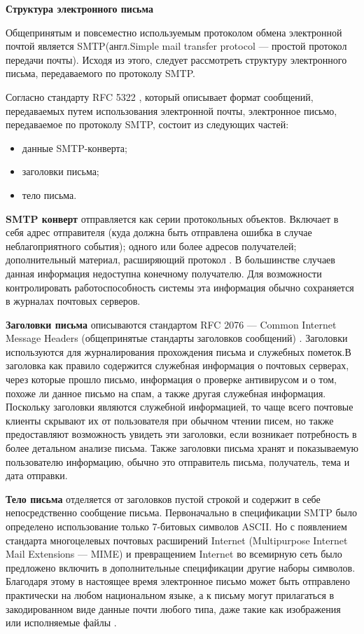 \textbf{Структура электронного письма}

Общепринятым и повсеместно используемым протоколом обмена электронной почтой является SMTP(англ.Simple mail transfer protocol — простой протокол передачи почты). Исходя из этого, следует рассмотреть структуру электронного письма, передаваемого по протоколу SMTP.

Согласно стандарту RFC 5322 \cite{rfc5322}, который описывает формат сообщений, передаваемых путем использования электронной почты, электронное письмо, передаваемое по протоколу SMTP, состоит из следующих частей:
 

\begin{itemize}
	\item данные SMTP-конверта;
	\item заголовки письма;
	\item тело письма. 
\end{itemize}

\textbf{SMTP конверт} отправляется как серии протокольных объектов. Включает в себя адрес отправителя (куда должна быть отправлена ошибка в случае неблагоприятного события); одного или более адресов получателей; дополнительный материал, расширяющий протокол \cite{BMSTU-WIKI-SMTP}.
В большинстве случаев данная информация недоступна конечному получателю. Для возможности контролировать работоспособность системы эта информация обычно сохраняется в журналах почтовых серверов.
 
\textbf{Заголовки письма} описываются стандартом RFC 2076 — Common Internet Message Headers (общепринятые стандарты заголовков сообщений) \cite{rfc2076}.
Заголовки используются для журналирования прохождения письма и служебных пометок.В заголовка как правило содержится служебная информация о почтовых серверах, через которые прошло письмо, информация о проверке антивирусом и о том, похоже ли данное письмо на спам, а также другая служебная информация.  Поскольку заголовки являются служебной информацией, то чаще всего почтовые клиенты скрывают их от пользователя при обычном чтении писем, но также предоставляют возможность увидеть эти заголовки, если возникает потребность в более детальном анализе письма. Также заголовки письма хранят и показываемую пользователю информацию, обычно это отправитель письма, получатель, тема и дата отправки. 

\textbf{Тело письма} отделяется от заголовков пустой строкой и содержит в себе непосредственно сообщение письма.  Первоначально в спецификации SMTP было определено использование только 7-битовых символов ASCII. Но с появлением стандарта многоцелевых почтовых расширений Internet (Multipurpose Internet Mail Extensions — MIME) и превращением Internet во всемирную сеть было предложено включить в дополнительные спецификации другие наборы символов. Благодаря этому в настоящее время электронное письмо может быть отправлено практически на любом национальном языке, а к письму могут прилагаться в закодированном виде данные почти любого типа, даже такие как изображения или исполняемые файлы \cite{BMSTU-WIKI-SMTP}.

